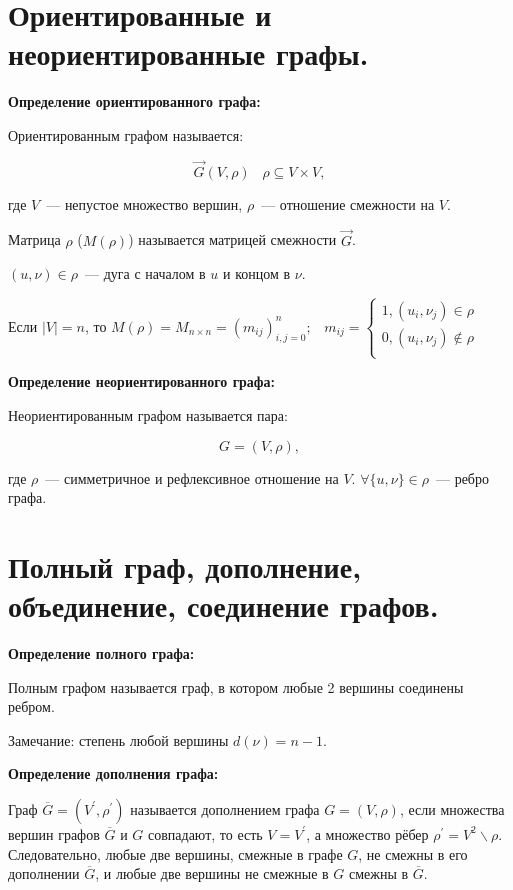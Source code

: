 \section{Ориентированные и неориентированные графы.}

\textbf{Определение ориентированного графа:}
    \smallskip

    Ориентированным графом называется:

    \[
        \overrightarrow{G}(V, \rho) \;\;\; \rho \subseteq V \times V,
    \]

    где $V$~--- непустое множество вершин, $\rho$~--- отношение смежности на $V$.
    \smallskip

    Матрица $\rho$ ($M(\rho)$) называется матрицей смежности $\overrightarrow{G}$.

    $(u, \nu) \in \rho$~--- дуга с началом в $u$ и концом в $\nu$.

    Если $|V| = n$, то $M(\rho) = M_{n \times n} = (m_{ij})^n_{i, j = 0}; \;\;\;
    m_{ij} = 
    \begin{cases}
        1, (u_i, \nu_j) \in \rho\\
        0, (u_i, \nu_j) \notin \rho\\
    \end{cases}$
    \bigskip

\textbf{Определение неориентированного графа:}
    \smallskip

    Неориентированным графом называется пара:

    \[
        G = (V, \rho),  
    \]

    где $\rho$~--- симметричное и рефлексивное отношение на $V$. $\forall
    \{u, \nu\} \in \rho$~--- ребро графа.

\section{Полный граф, дополнение, объединение, соединение графов.}

\textbf{Определение полного графа:}
    \smallskip

    Полным графом называется граф, в котором любые 2 вершины соединены
    ребром.
    \smallskip

    Замечание: степень любой вершины $d(\nu) = n - 1$.
    \bigskip

\textbf{Определение дополнения графа:}
    \smallskip
    
    Граф $\overline{G} = (V^{'}, \rho^{'})$ называется дополнением графа
    $G = (V, \rho)$, если  множества вершин графов $\overline{G}$ и $G$ совпадают,
    то есть $V = V^{'}$,  а множество рёбер $\rho^{'} = V^2 \backslash \rho$.
    Следовательно, любые две вершины, смежные в графе $G$, не смежны в его дополнении
    $\overline{G}$, и любые две вершины не смежные в $G$ смежны в $\overline{G}$.

